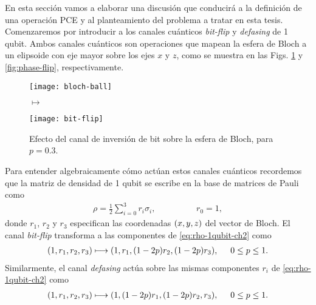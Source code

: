 %

En esta sección vamos a elaborar una discusión que conducirá a
la definición de una operación PCE y al planteamiento del problema
a tratar en esta tesis. 
Comenzaremos por introducir a los canales cuánticos  
\textit{bit-flip} y \textit{defasing} de 1 qubit. 
Ambos canales cuánticos son operaciones que mapean 
la esfera de Bloch a un elipsoide con eje mayor sobre los ejes $x$ y $z$, 
como se muestra en las Figs. \ref{fig:bit-flip} y \ref{fig:phase-flip}, 
respectivamente.
\begin{figure}
\centering
\begin{minipage}{.4\textwidth}
    \centering
    \texttt{[image: bloch-ball]}
\end{minipage}
\LARGE{$\longmapsto$}
\begin{minipage}{0.4\textwidth}
    \centering
    \texttt{[image: bit-flip]}
\end{minipage}
\caption{
Efecto del canal de inversión de bit sobre la esfera de Bloch, para $p=0.3$. \ep}
\label{fig:bit-flip}
\end{figure}
Para entender algebraicamente cómo actúan estos canales cuánticos 
recordemos que la matriz de densidad de 1 qubit se escribe en la 
base de matrices de Pauli como
\begin{align}\label{eq:rho-1qubit-ch2}
\rho=\frac{1}{2}\sum_{i=0}^3r_i\sigma_i,\hspace{2cm}r_0=1,
\end{align}
donde $r_1$, $r_2$ y $r_3$ especifican las coordenadas $\qty(x,y,z)$ 
del vector de Bloch. El canal \textit{bit-flip} transforma a las componentes 
de \eqref{eq:rho-1qubit-ch2} como~\cite{nielsen_chuang_2011}
\begin{align}\label{eq:bit-flip-transformation}
\qty(1,r_1,r_2,r_3)\longmapsto \qty(1,r_1,(1-2p)r_2,(1-2p)r_3),
\hspace{.5cm} 0\leq p\leq 1.
\end{align}
Similarmente, el canal \textit{defasing} actúa sobre las mismas
componentes $r_i$ de \eqref{eq:rho-1qubit-ch2}
como~\cite{nielsen_chuang_2011}
\begin{align}\label{eq:defasing-transformation}
\qty(1,r_1,r_2,r_3)\longmapsto \qty(1,(1-2p)r_1,(1-2p)r_2,r_3),
\hspace{.5cm} 0\leq p\leq 1.
\end{align}

